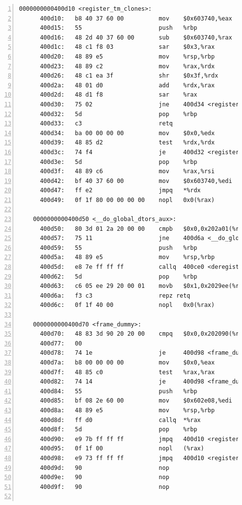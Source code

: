 \documentclass{article}
\begin{document}
\begin{lstlisting}[title = bomb的反汇编代码及部分注释, xleftmargin = 2em,xrightmargin = 2em, aboveskip = 1em, numbers = left, basicstyle=\scriptsize\ttfamily, numberstyle=\scriptsize]
    0000000000400d10 <register_tm_clones>:
      400d10:	b8 40 37 60 00       	mov    $0x603740,%eax
      400d15:	55                   	push   %rbp
      400d16:	48 2d 40 37 60 00    	sub    $0x603740,%rax
      400d1c:	48 c1 f8 03          	sar    $0x3,%rax
      400d20:	48 89 e5             	mov    %rsp,%rbp
      400d23:	48 89 c2             	mov    %rax,%rdx
      400d26:	48 c1 ea 3f          	shr    $0x3f,%rdx
      400d2a:	48 01 d0             	add    %rdx,%rax
      400d2d:	48 d1 f8             	sar    %rax
      400d30:	75 02                	jne    400d34 <register_tm_clones+0x24>
      400d32:	5d                   	pop    %rbp
      400d33:	c3                   	retq   
      400d34:	ba 00 00 00 00       	mov    $0x0,%edx
      400d39:	48 85 d2             	test   %rdx,%rdx
      400d3c:	74 f4                	je     400d32 <register_tm_clones+0x22>
      400d3e:	5d                   	pop    %rbp
      400d3f:	48 89 c6             	mov    %rax,%rsi
      400d42:	bf 40 37 60 00       	mov    $0x603740,%edi
      400d47:	ff e2                	jmpq   *%rdx
      400d49:	0f 1f 80 00 00 00 00 	nopl   0x0(%rax)
    
    0000000000400d50 <__do_global_dtors_aux>:
      400d50:	80 3d 01 2a 20 00 00 	cmpb   $0x0,0x202a01(%rip)        # 603758 <completed.6976>
      400d57:	75 11                	jne    400d6a <__do_global_dtors_aux+0x1a>
      400d59:	55                   	push   %rbp
      400d5a:	48 89 e5             	mov    %rsp,%rbp
      400d5d:	e8 7e ff ff ff       	callq  400ce0 <deregister_tm_clones>
      400d62:	5d                   	pop    %rbp
      400d63:	c6 05 ee 29 20 00 01 	movb   $0x1,0x2029ee(%rip)        # 603758 <completed.6976>
      400d6a:	f3 c3                	repz retq 
      400d6c:	0f 1f 40 00          	nopl   0x0(%rax)
    
    0000000000400d70 <frame_dummy>:
      400d70:	48 83 3d 90 20 20 00 	cmpq   $0x0,0x202090(%rip)        # 602e08 <__JCR_END__>
      400d77:	00 
      400d78:	74 1e                	je     400d98 <frame_dummy+0x28>
      400d7a:	b8 00 00 00 00       	mov    $0x0,%eax
      400d7f:	48 85 c0             	test   %rax,%rax
      400d82:	74 14                	je     400d98 <frame_dummy+0x28>
      400d84:	55                   	push   %rbp
      400d85:	bf 08 2e 60 00       	mov    $0x602e08,%edi
      400d8a:	48 89 e5             	mov    %rsp,%rbp
      400d8d:	ff d0                	callq  *%rax
      400d8f:	5d                   	pop    %rbp
      400d90:	e9 7b ff ff ff       	jmpq   400d10 <register_tm_clones>
      400d95:	0f 1f 00             	nopl   (%rax)
      400d98:	e9 73 ff ff ff       	jmpq   400d10 <register_tm_clones>
      400d9d:	90                   	nop
      400d9e:	90                   	nop
      400d9f:	90                   	nop
    

\end{lstlisting}
\end{document}

